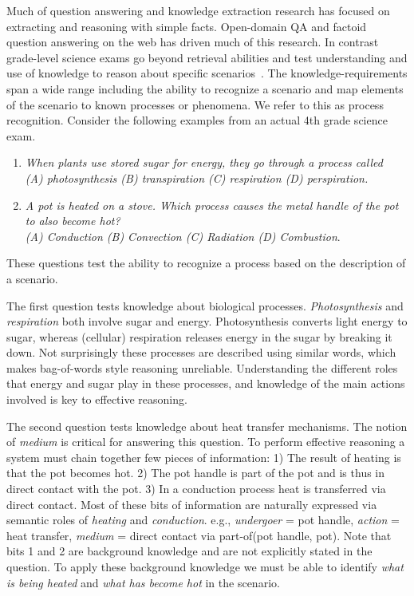 Much of question answering and knowledge extraction research has focused on extracting and reasoning with simple facts. 
Open-domain QA and factoid question answering on the web has driven much of this research. 
In contrast grade-level science exams go beyond retrieval abilities and test understanding and use of knowledge to reason about specific scenarios~\cite{clark2014:akbc}.
The knowledge-requirements span a wide range including the ability to recognize a scenario and map elements of the scenario to known processes or phenomena. We refer to this as process recognition. Consider the following examples from an actual 4th grade science exam.

\begin{enumerate}
\item {\em When plants use stored sugar for energy, they go through a process called \\
(A) photosynthesis (B) transpiration (C) respiration (D) perspiration.}
\item {\em A pot is heated on a stove. Which process causes the metal handle of the pot to also become hot? \\
(A) Conduction (B) Convection (C) Radiation (D) Combustion}. \\
\end{enumerate}

These questions test the ability to recognize a process based on the description of a scenario. 

The first question tests knowledge about biological processes.
{\em Photosynthesis} and {\em respiration} both involve sugar and energy. 
Photosynthesis converts light energy to sugar, whereas (cellular) respiration releases energy in the sugar by breaking it down. 
Not surprisingly these processes are described using similar words, which makes bag-of-words style reasoning unreliable. 
Understanding the different roles that energy and sugar play in these processes, and knowledge of the main actions involved is key to effective reasoning.

The second question tests knowledge about heat transfer mechanisms.
The notion of {\em medium} is critical for answering this question.
To perform effective reasoning a system must chain together few pieces of information:
1) The result of heating is that the pot becomes hot. 
2) The pot handle is part of the pot and is thus in direct contact with the pot. 
3) In a conduction process heat is transferred via direct contact.
Most of these bits of information are naturally expressed via semantic roles of {\em heating} and {\em conduction}.
e.g., {\em undergoer} = pot handle, {\em action} = heat transfer, {\em medium} = direct contact via part-of(pot handle, pot).
Note that bits 1 and 2 are background knowledge and are not explicitly stated in the question. 
To apply these background knowledge we must be able to identify {\em what is being heated} and {\em what has become hot}
in the scenario.


